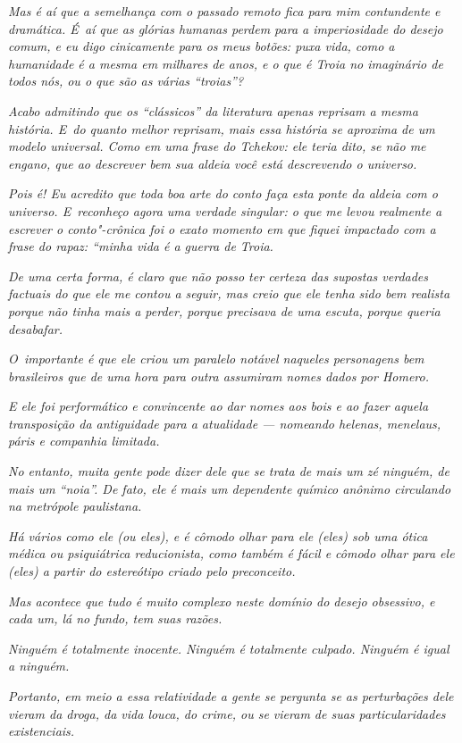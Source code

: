 \emph{Mas é aí que a semelhança com o passado remoto fica para mim
contundente e dramática. É~aí que as glórias humanas perdem para a
imperiosidade do desejo comum, e eu digo cinicamente para os meus
botões: puxa vida, como a humanidade é a mesma em milhares de anos, e o
que é Troia no imaginário de todos nós, ou o que são as várias
``troias''?}~

\emph{Acabo admitindo que os ``clássicos'' da literatura apenas reprisam
a mesma história. E~do quanto melhor reprisam, mais essa história se
aproxima de um modelo universal. Como em uma frase do Tchekov: ele teria
dito, se não me engano, que ao descrever bem sua aldeia você está
descrevendo o universo.}~

\emph{Pois é! Eu acredito que toda boa arte do conto faça esta ponte da
aldeia com o universo. E~reconheço agora uma verdade singular: o que me
levou realmente a escrever o conto"-crônica foi o exato momento em que
fiquei impactado com a frase do rapaz: ``minha vida é a guerra de
Troia.}~

\emph{De uma certa forma, é claro que não posso ter certeza das supostas
verdades factuais do que ele me contou a seguir, mas creio que ele tenha
sido bem realista porque não tinha mais a perder, porque precisava de
uma escuta, porque queria desabafar.}~

\emph{O~importante é que ele criou um paralelo notável naqueles
personagens bem brasileiros que de uma hora para outra assumiram nomes
dados por Homero.}~

\emph{E ele foi performático e convincente ao dar nomes aos bois e ao
fazer aquela transposição da antiguidade para a atualidade --- nomeando
helenas, menelaus, páris e companhia limitada.}~

\emph{No entanto, muita gente pode dizer dele que se trata de mais um zé
ninguém, de mais um ``noia''. De fato, ele é mais um dependente químico
anônimo circulando na metrópole paulistana.}~

\emph{Há vários como ele (ou eles), e é cômodo olhar para ele (eles) sob
uma ótica médica ou psiquiátrica reducionista, como também é fácil e
cômodo olhar para ele (eles) a partir do estereótipo criado pelo
preconceito.}~

\emph{Mas acontece que tudo é muito complexo neste domínio do desejo
obsessivo, e cada um, lá no fundo, tem suas razões.}~

\emph{Ninguém é totalmente inocente. Ninguém é totalmente culpado.
Ninguém é igual a ninguém.}~

\emph{Portanto, em meio a essa relatividade a gente se pergunta se as
perturbações dele vieram da droga, da vida louca, do crime, ou se vieram
de suas particularidades existenciais.}~

